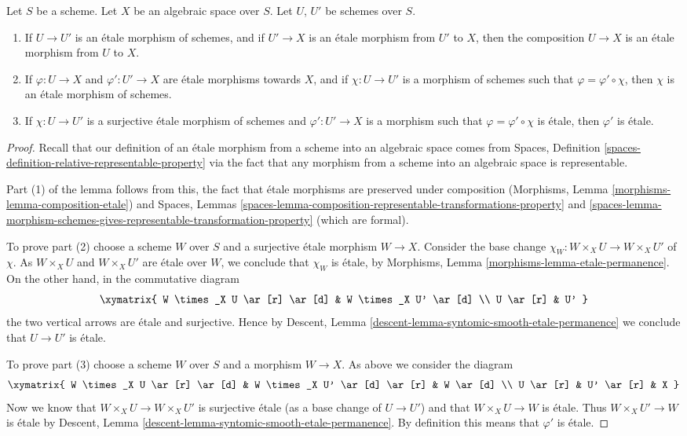 \begin{lemma}
\label{lemma-etale-over-space}
Let $S$ be a scheme.
Let $X$ be an algebraic space over $S$.
Let $U$, $U'$ be schemes over $S$.
\begin{enumerate}
\item If $U \to U'$ is an \'etale morphism of schemes, and
if $U' \to X$ is an \'etale morphism from $U'$ to $X$, then the
composition $U \to X$ is an \'etale morphism from $U$ to $X$.
\item If $\varphi : U \to X$ and $\varphi' : U' \to X$ are
\'etale morphisms towards $X$, and if $\chi : U \to U'$ is a
morphism of schemes such that $\varphi = \varphi' \circ \chi$,
then $\chi$ is an \'etale morphism of schemes.
\item If $\chi : U \to U'$ is a surjective \'etale morphism
of schemes and $\varphi' : U' \to X$ is a morphism such that
$\varphi = \varphi' \circ \chi$ is \'etale, then $\varphi'$
is \'etale.
\end{enumerate}
\end{lemma}

\begin{proof}
Recall that our definition of an \'etale morphism from a scheme into an
algebraic space comes from
Spaces, Definition
\ref{spaces-definition-relative-representable-property}
via the fact that any morphism from a scheme into an algebraic space
is representable.

\medskip\noindent
Part (1) of the lemma follows from this, the fact that
\'etale morphisms are preserved under composition
(Morphisms, Lemma
\ref{morphisms-lemma-composition-etale})
and
Spaces, Lemmas
\ref{spaces-lemma-composition-representable-transformations-property} and
\ref{spaces-lemma-morphism-schemes-gives-representable-transformation-property}
(which are formal).

\medskip\noindent
To prove part (2) choose a scheme $W$ over $S$ and a
surjective \'etale morphism $W \to X$. Consider the base change
$\chi_W : W \times_X U \to W \times_X U'$ of $\chi$.
As $W \times_X U$ and $W \times_X U'$ are \'etale over $W$, we conclude that
$\chi_W$ is \'etale, by
Morphisms, Lemma \ref{morphisms-lemma-etale-permanence}.
On the other hand, in the commutative diagram
$$
\xymatrix{
W \times_X U \ar[r] \ar[d] & W \times_X U' \ar[d] \\
U \ar[r] & U'
}
$$
the two vertical arrows are \'etale and surjective.
Hence by
Descent, Lemma \ref{descent-lemma-syntomic-smooth-etale-permanence}
we conclude that $U \to U'$ is \'etale.

\medskip\noindent
To prove part (3) choose a scheme $W$ over $S$ and a morphism $W \to X$.
As above we consider the diagram
$$
\xymatrix{
W \times_X U \ar[r] \ar[d] & W \times_X U' \ar[d] \ar[r] & W \ar[d] \\
U \ar[r] & U' \ar[r] & X
}
$$
Now we know that $W \times_X U \to W \times_X U'$ is surjective \'etale
(as a base change of $U \to U'$)
and that $W \times_X U \to W$ is \'etale. Thus $W \times_X U' \to W$
is \'etale by Descent, Lemma
\ref{descent-lemma-syntomic-smooth-etale-permanence}. By definition
this means that $\varphi'$ is \'etale.
\end{proof}

